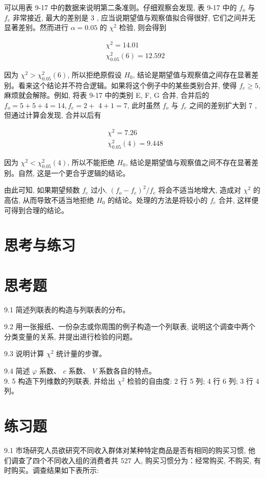 \documentclass[10pt]{article}
\begin{document}
\begin{CJK*}{UTF8}{bsmi}
可以用表 9-17 中的数据来说明第二条准则。仔细观察会发现, 表 9-17 中的 $f_{o}$ 与 $f_{e}$ 非常接近, 最大的差别是 3 , 应当说期望值与观察值拟合得很好, 它们之间并无显著差别。然而进行 $\alpha=0.05$ 的 $\chi^{2}$ 检验, 则会得到

$$
\begin{aligned}
& \chi^{2}=14.01 \\
& \chi_{0.05}^{2}(6)=12.592
\end{aligned}
$$

因为 $\chi^{2}>\chi_{0.05}^{2}(6)$, 所以拒绝原假设 $H_{0}$, 结论是期望值与观察值之间存在显著差别。看来这个结论并不符合逻辑。如果将这个例子中的某些类别合并, 使得 $f_{e} \geqslant 5$, 麻烦就会解除。例如, 将表 9-17 中的类别 E, F, G 合并, 合并后的 $f_{o}=5+5+4=14, f_{e}=2+$ $4+1=7$, 此时虽然 $f_{o}$ 与 $f_{e}$ 之间的差别扩大到 7 , 但通过计算会发现, 合并以后有

$$
\begin{aligned}
& \chi^{2}=7.26 \\
& \chi_{0.05}^{2}(4)=9.448
\end{aligned}
$$

因为 $\chi^{2}<\chi_{0.05}^{2}(4)$, 所以不能拒绝 $H_{0}$, 结论是期望值与观察值之间不存在显著差别。自然, 这是一个更合乎逻辑的结论。

由此可知, 如果期望频数 $f_{e}$ 过小, $\left(f_{o}-f_{e}\right)^{2} / f_{e}$ 将会不适当地增大, 造成对 $\chi^{2}$ 的高估, 从而导致不适当地拒绝 $H_{0}$ 的结论。处理的方法是将较小的 $f_{e}$ 合并, 这样便可得到合理的结论。

\section*{思考与练习}
\section*{思考题}
9.1 简述列联表的构造与列联表的分布。

9.2 用一张报纸、一份杂志或你周围的例子构造一个列联表, 说明这个调查中两个分类变量的关系, 并提出进行检验的问题。

9.3 说明计算 $\chi^{2}$ 统计量的步骤。

9.4 简述 $\varphi$ 系数、 $c$ 系数、 $V$ 系数各自的特点。\\
9. 5 构造下列维数的列联表, 并给出 $\chi^{2}$ 检验的自由度: 2 行 5 列; 4 行 6 列; 3 行 4 列。

\section*{练习题}
9.1 市场研究人员欲研究不同收入群体对某种特定商品是否有相同的购买习惯, 他们调查了四个不同收入组的消费者共 527 人, 购买习惯分为：经常购买, 不购买, 有时购买。调查结果如下表所示:


\end{CJK*}
\end{document}
